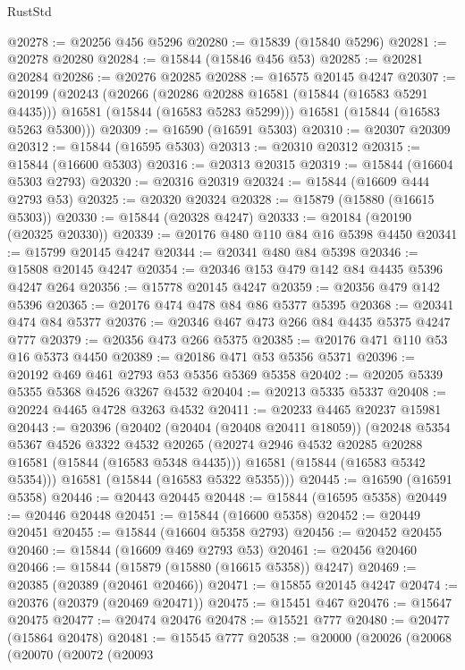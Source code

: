 \begin{lexlean}{RustStd}
\begin{coremodule}
@20278 := @20256 @456 @5296
@20280 := @15839 (@15840 @5296)
@20281 := @20278 @20280
@20284 := @15844 (@15846 @456 @53)
@20285 := @20281 @20284
@20286 := @20276 @20285
@20288 := @16575 @20145 @4247
@20307 := @20199
    (@20243
      (@20266
        (@20286 @20288 @16581 (@15844 (@16583 @5291 @4435)))
        @16581
        (@15844 (@16583 @5283 @5299)))
      @16581
      (@15844 (@16583 @5263 @5300)))
@20309 := @16590 (@16591 @5303)
@20310 := @20307 @20309
@20312 := @15844 (@16595 @5303)
@20313 := @20310 @20312
@20315 := @15844 (@16600 @5303)
@20316 := @20313 @20315
@20319 := @15844 (@16604 @5303 @2793)
@20320 := @20316 @20319
@20324 := @15844 (@16609 @444 @2793 @53)
@20325 := @20320 @20324
@20328 := @15879 (@15880 (@16615 @5303))
@20330 := @15844 (@20328 @4247)
@20333 := @20184 (@20190 (@20325 @20330))
@20339 := @20176 @480 @110 @84 @16 @5398 @4450
@20341 := @15799 @20145 @4247
@20344 := @20341 @480 @84 @5398
@20346 := @15808 @20145 @4247
@20354 := @20346 @153 @479 @142 @84 @4435 @5396 @4247 @264
@20356 := @15778 @20145 @4247
@20359 := @20356 @479 @142 @5396
@20365 := @20176 @474 @478 @84 @86 @5377 @5395
@20368 := @20341 @474 @84 @5377
@20376 := @20346 @467 @473 @266 @84 @4435 @5375 @4247 @777
@20379 := @20356 @473 @266 @5375
@20385 := @20176 @471 @110 @53 @16 @5373 @4450
@20389 := @20186 @471 @53 @5356 @5371
@20396 := @20192 @469 @461 @2793 @53 @5356 @5369 @5358
@20402 := @20205 @5339 @5355 @5368 @4526 @3267 @4532
@20404 := @20213 @5335 @5337
@20408 := @20224 @4465 @4728 @3263 @4532
@20411 := @20233 @4465 @20237 @15981
@20443 := @20396
    (@20402
      (@20404 (@20408 @20411 @18059))
      (@20248
        @5354
        @5367
        @4526
        @3322
        @4532
        @20265
        (@20274 @2946 @4532 @20285 @20288 @16581 (@15844 (@16583 @5348 @4435)))
        @16581
        (@15844 (@16583 @5342 @5354)))
      @16581
      (@15844 (@16583 @5322 @5355)))
@20445 := @16590 (@16591 @5358)
@20446 := @20443 @20445
@20448 := @15844 (@16595 @5358)
@20449 := @20446 @20448
@20451 := @15844 (@16600 @5358)
@20452 := @20449 @20451
@20455 := @15844 (@16604 @5358 @2793)
@20456 := @20452 @20455
@20460 := @15844 (@16609 @469 @2793 @53)
@20461 := @20456 @20460
@20466 := @15844 (@15879 (@15880 (@16615 @5358)) @4247)
@20469 := @20385 (@20389 (@20461 @20466))
@20471 := @15855 @20145 @4247
@20474 := @20376 (@20379 (@20469 @20471))
@20475 := @15451 @467
@20476 := @15647 @20475
@20477 := @20474 @20476
@20478 := @15521 @777
@20480 := @20477 (@15864 @20478)
@20481 := @15545 @777
@20538 := @20000
    (@20026
      (@20068
        (@20070
          (@20072
            (@20093

\end{coremodule}
\end{lexlean}
